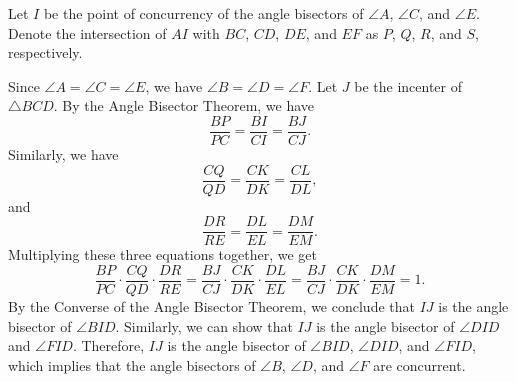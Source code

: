 Let $I$ be the point of concurrency of the angle bisectors of $\angle A$, $\angle C$, and $\angle E$. Denote the intersection of $AI$ with $BC$, $CD$, $DE$, and $EF$ as $P$, $Q$, $R$, and $S$, respectively. 

Since $\angle A = \angle C = \angle E$, we have $\angle B = \angle D = \angle F$. Let $J$ be the incenter of $\triangle BCD$. By the Angle Bisector Theorem, we have
\[\frac{BP}{PC} = \frac{BI}{CI} = \frac{BJ}{CJ}.\]
Similarly, we have
\[\frac{CQ}{QD} = \frac{CK}{DK} = \frac{CL}{DL},\]
and
\[\frac{DR}{RE} = \frac{DL}{EL} = \frac{DM}{EM}.\]
Multiplying these three equations together, we get
\[\frac{BP}{PC} \cdot \frac{CQ}{QD} \cdot \frac{DR}{RE} = \frac{BJ}{CJ} \cdot \frac{CK}{DK} \cdot \frac{DL}{EL} = \frac{BJ}{CJ} \cdot \frac{CK}{DK} \cdot \frac{DM}{EM} = 1.\]
By the Converse of the Angle Bisector Theorem, we conclude that $IJ$ is the angle bisector of $\angle BID$. Similarly, we can show that $IJ$ is the angle bisector of $\angle DID$ and $\angle FID$. Therefore, $IJ$ is the angle bisector of $\angle BID$, $\angle DID$, and $\angle FID$, which implies that the angle bisectors of $\angle B$, $\angle D$, and $\angle F$ are concurrent.
